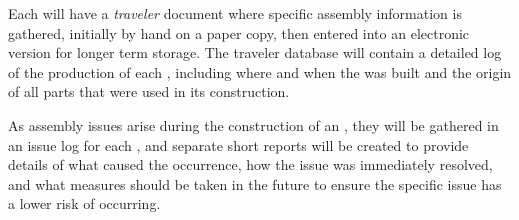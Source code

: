 Each  will have a \textit{traveler} document where specific assembly information is gathered, initially by hand on a paper copy, then entered into an electronic version for longer term storage.  The traveler database will contain a detailed log of the production of each , including where and when the  was built and the origin of all parts that were used in its construction. 

As assembly issues arise during the construction of an , they will be gathered in an issue log for each , and separate short reports will be created to provide details of what caused the occurrence, how the issue was immediately resolved, and what measures should be taken in the future to ensure the specific issue has a lower risk of occurring.  




